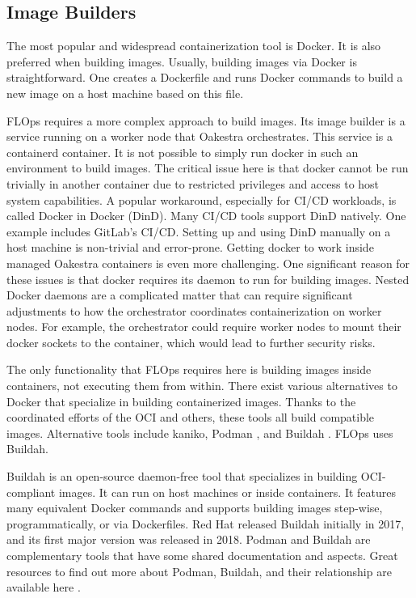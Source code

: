 \subsection{Image Builders}

The most popular and widespread containerization tool is Docker.
It is also preferred when building images.
Usually, building images via Docker is straightforward.
One creates a Dockerfile and runs Docker commands to build a new image on a host machine based on this file.

FLOps requires a more complex approach to build images.
Its image builder is a service running on a worker node that Oakestra orchestrates.
This service is a containerd container.
It is not possible to simply run docker in such an environment to build images.
The critical issue here is that docker cannot be run trivially in another container due to restricted privileges and access to host system capabilities.
A popular workaround, especially for CI/CD workloads, is called Docker in Docker (DinD).
Many CI/CD tools support DinD natively.
One example includes GitLab's CI/CD.
Setting up and using DinD manually on a host machine is non-trivial and error-prone.
Getting docker to work inside managed Oakestra containers is even more challenging.
One significant reason for these issues is that docker requires its daemon to run for building images.
Nested Docker daemons are a complicated matter that can require significant adjustments to how the orchestrator coordinates containerization on worker nodes.
For example, the orchestrator could require worker nodes to mount their docker sockets to the container, which would lead to further security risks.

The only functionality that FLOps requires here is building images inside containers, not executing them from within.
There exist various alternatives to Docker that specialize in building containerized images.
Thanks to the coordinated efforts of the OCI \cite{open_container_initiative} and others, these tools all build compatible images.
Alternative tools include kaniko, Podman \cite{docs:podman}, and Buildah \cite{buildah_homepage}.
FLOps uses Buildah.

Buildah is an open-source daemon-free tool that specializes in building OCI-compliant images.
It can run on host machines or inside containers.
It features many equivalent Docker commands and supports building images step-wise, programmatically, or via Dockerfiles.
Red Hat released Buildah initially in 2017, and its first major version was released in 2018.
Podman and Buildah are complementary tools that have some shared documentation and aspects.
Great resources to find out more about Podman, Buildah, and their relationship are available here \cite{redhat_docs:podman,redhat_docs:buildah,buildah_vs_podman}.

